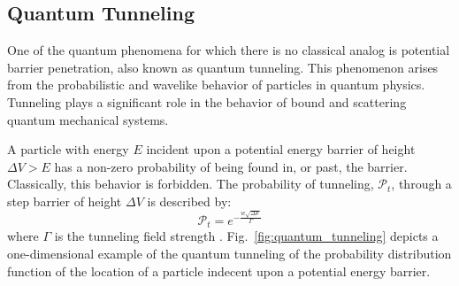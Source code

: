 \documentclass[11pt]{afthesis}
\begin{document}
	\subsection{Quantum Tunneling} 
	
	
	One of the quantum phenomena for which there is no classical analog is potential barrier penetration, also known as quantum tunneling. This phenomenon arises from the probabilistic and wavelike behavior of particles in quantum physics. Tunneling plays a significant role in the behavior of bound and scattering quantum mechanical systems.
	
	A particle with energy \begin{math} E \end{math} incident upon a potential energy barrier of height \begin{math} \Delta V > E  \end{math} has a non-zero probability of being found in, or past, the barrier. Classically, this behavior is forbidden. The probability of tunneling, \begin{math} \mathcal{P}_t \end{math}, through a step barrier of height \begin{math} \Delta V  \end{math} is described by: 
	\begin{equation}
	\mathcal{P}_t = e^{-\frac{w \sqrt{\Delta V}}{ \Gamma}} 
	\label{eq:quantum_tunneling_prob}
	\end{equation} where \begin{math} \Gamma \end{math} is the tunneling field strength \cite{mukherjee2015multivariatesearchqa}. Fig.~\ref{fig:quantum_tunneling} depicts a one-dimensional example of the quantum tunneling of the probability distribution function of the location of a particle indecent upon a potential energy barrier.
	
\end{document}
